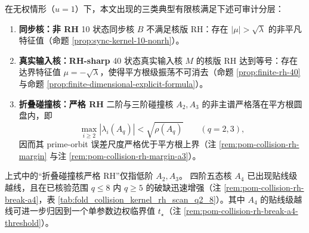 \begin{proposition}\label{prop:rh-stratification-three-kernels}
在无权情形（$u=1$）下，本文出现的三类典型有限核满足下述可审计分层：
\begin{enumerate}
  \item \textbf{同步核：非 RH} 10 状态同步核 $B$ 不满足核版 RH：存在 \(|\mu|>\sqrt{\lambda}\) 的非平凡特征值（命题 \ref{prop:sync-kernel-10-nonrh}）。
  \item \textbf{真实输入核：RH-sharp} 40 状态真实输入核 $M$ 的核版 RH 达到等号：存在达界特征值 \(\mu=-\sqrt{\lambda}\)，使得平方根级振荡不可消去（命题 \ref{prop:finite-rh-40} 与命题 \ref{prop:finite-dimensional-explicit-formula}）。
  \item \textbf{折叠碰撞核：严格 RH} 二阶与三阶碰撞核 \(A_2,A_3\) 的非主谱严格落在平方根圆盘内，即
  \[
  \max_{i\ge 2}|\lambda_i(A_q)|<\sqrt{\rho(A_q)}\qquad(q=2,3),
\]
  因而其 prime-orbit 误差尺度严格优于平方根上界（注 \ref{rem:pom-collision-rh-margin} 与注 \ref{rem:pom-collision-rh-margin-a3}）。
\end{enumerate}
\end{proposition}

\begin{remark}[高阶折叠碰撞核的 near-RH 越线：从 \texorpdfstring{$q=4$}{q=4} 起]\label{rem:collision-kernel-rh-break-q4}
上式中的“折叠碰撞核严格 RH”仅指低阶 \(A_2,A_3\)。
四阶五态核 \(A_4\) 已出现贴线级越线，且在已核验范围 \(q\le 8\) 内 \(q\ge 5\) 的破缺迅速增强（注 \ref{rem:pom-collision-rh-break-a4}，表 \ref{tab:fold_collision_kernel_rh_scan_q2_8}）。其中 \(A_4\) 的贴线级越线可进一步归因到一个单参数边权临界值 \(t_\star\)（注 \ref{rem:pom-collision-rh-break-a4-threshold}）。
\end{remark}

